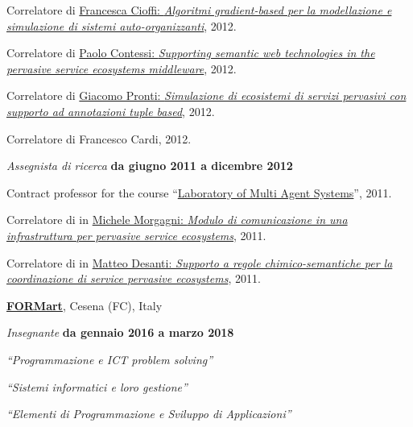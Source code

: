 \documentclass[10pt]{article}
\newenvironment{outerlist}[1][\enskip\textbullet]%
        {\begin{itemize}[#1]}{\end{itemize}%
         \vspace{-.6\baselineskip}}
\newenvironment{innerlist}[1][\enskip\textbullet]%
        {\begin{compactitem}[#1]}{\end{compactitem}}
\newcommand{\halfblankline}{\quad\vspace{-0.5\baselineskip}\pagebreak[3]}
\begin{document}
\begin{outerlist}
\begin{innerlist}
      \item Correlatore di \href{http://amslaurea.unibo.it/4088/}{Francesca Cioffi: \textit{Algoritmi gradient-based per la modellazione e simulazione di sistemi auto-organizzanti}}, 2012.
      \item Correlatore di \href{http://amslaurea.unibo.it/4074/}{Paolo Contessi: \textit{Supporting semantic web technologies in the pervasive service ecosystems middleware}}, 2012.
      \item Correlatore di \href{http://www.alice.unibo.it/xwiki/bin/view/Theses/ProntiAlchemistSapere/}{Giacomo Pronti: \textit{Simulazione di ecosistemi di servizi pervasivi con supporto ad annotazioni tuple based}}, 2012.
      \item Correlatore di Francesco Cardi, 2012.
    \end{innerlist}
\item[] \textit{Assegnista di ricerca} \hfill \textbf{da giugno 2011 a dicembre 2012}
    \begin{innerlist}
      \item Contract professor for the course ``\href{http://apice.unibo.it/xwiki/bin/view/Courses/SmaLm1112Lab}{Laboratory of Multi Agent Systems}'', 2011.
      \item Correlatore di in \href{http://apice.unibo.it/xwiki/bin/view/Theses/SapereComm}{Michele Morgagni: \textit{Modulo di comunicazione in una infrastruttura per pervasive service ecosystems}}, 2011.
      \item Correlatore di in \href{http://www.alice.unibo.it/xwiki/bin/view/Theses/LSAspace}{Matteo Desanti: \textit{Supporto a regole chimico-semantiche per la coordinazione di service pervasive ecosystems}}, 2011.
    \end{innerlist}
\halfblankline
\end{outerlist}

\href{http://www.formart.it/}{\textbf{FORMart}}, Cesena (FC), Italy
\begin{outerlist}
\item[] \textit{Insegnante} \hfill \textbf{da gennaio 2016 a marzo 2018}
    \begin{innerlist}
        \item \textit{``Programmazione e ICT problem solving''}
        \item \textit{``Sistemi informatici e loro gestione''}
        \item \textit{``Elementi di Programmazione e Sviluppo di Applicazioni''}
    \end{innerlist}
\halfblankline
\end{outerlist}
\end{document}
